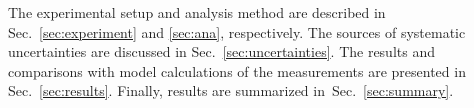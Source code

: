 The experimental setup and analysis method are described in Sec.~\ref{sec:experiment} and \ref{sec:ana}, respectively. The sources of systematic uncertainties are discussed in Sec.~\ref{sec:uncertainties}. The results and comparisons with model calculations of the measurements are presented in Sec.~\ref{sec:results}. Finally, results are summarized in~Sec.~\ref{sec:summary}.

